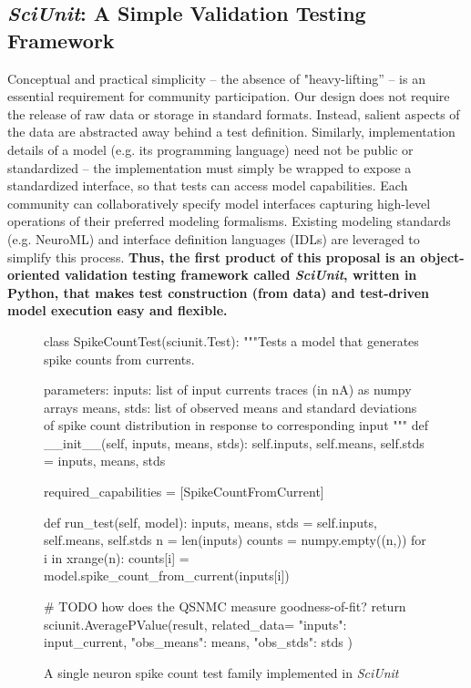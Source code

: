 \documentclass[11pt,letterpaper]{article}
\begin{document}
\subsection{\textit{SciUnit}: A Simple Validation Testing Framework}
Conceptual and practical simplicity -- the absence of "heavy-lifting'' -- is an essential requirement for community participation. Our design does not require the release of raw data or storage in standard formats. Instead, salient aspects of the data are abstracted away behind a test definition. Similarly, implementation details of a model (e.g. its programming language) need not be public or standardized -- the implementation must simply be wrapped to expose a standardized interface, so that tests can access model capabilities. Each community can collaboratively specify model interfaces capturing high-level operations of their preferred modeling formalisms. Existing modeling standards (e.g. NeuroML\cite{neuroml_url,gleeson_neuroml:_2010}) and interface definition languages (IDLs)\cite{bachmann2008} are leveraged to simplify this process. \textbf{Thus, the first product of this proposal is an object-oriented validation testing framework called \textit{SciUnit}, written in Python, that makes test construction (from data) and test-driven model execution easy and flexible.} 

\begin{figure}
\small
\begin{python}
class SpikeCountTest(sciunit.Test):
  """Tests a model that generates spike counts from currents.

  parameters:
    inputs: list of input currents traces (in nA) as numpy arrays
    means, stds: list of observed means and standard deviations of 
      spike count distribution in response to corresponding input
  """
  def __init__(self, inputs, means, stds):
    self.inputs, self.means, self.stds = inputs, means, stds
	
  required_capabilities = [SpikeCountFromCurrent]
	
  def run_test(self, model):
    inputs, means, stds = self.inputs, self.means, self.stds
    n = len(inputs)
    counts = numpy.empty((n,))
    for i in xrange(n):
      counts[i] = model.spike_count_from_current(inputs[i])
      
    # TODO how does the QSNMC measure goodness-of-fit?
    return sciunit.AveragePValue(result, related_data={
      "inputs": input_current,
      "obs_means": means,
      "obs_stds": stds
    })
\end{python}
\vspace{-5px}
\caption{A single neuron spike count test family implemented in \textit{SciUnit}}
\label{fig:rate_test}
\vspace{-10px}
\end{figure}
\end{document}
